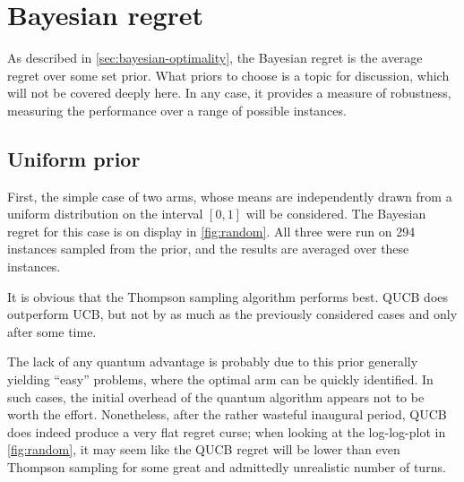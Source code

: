 \section{Bayesian regret}
\label{sec:results_bayesian}
As described in \cref{sec:bayesian-optimality}, the Bayesian regret is the average regret over some set prior.
What priors to choose is a topic for discussion, which will not be covered deeply here.
In any case, it provides a measure of robustness, measuring the performance over a range of possible instances.

\subsection{Uniform prior}
First, the simple case of two arms, whose means are independently drawn from a uniform distribution on the interval $[0, 1]$ will be considered.
The Bayesian regret for this case is on display in \cref{fig:random}.
All three were run on 294 instances sampled from the prior\footnotemark, and the results are averaged over these instances.


It is obvious that the Thompson sampling algorithm performs best.
QUCB does outperform UCB, but not by as much as the previously considered cases and only after some time.

The lack of any quantum advantage is probably due to this prior generally yielding \enquote{easy} problems, where the optimal arm can be quickly identified.
In such cases, the initial overhead of the quantum algorithm appears not to be worth the effort.
Nonetheless, after the rather wasteful inaugural period, QUCB does indeed produce a very flat regret curse; when looking at the log-log-plot in \cref{fig:random}, it may seem like the QUCB regret will be lower than even Thompson sampling for some great and admittedly unrealistic number of turns.



